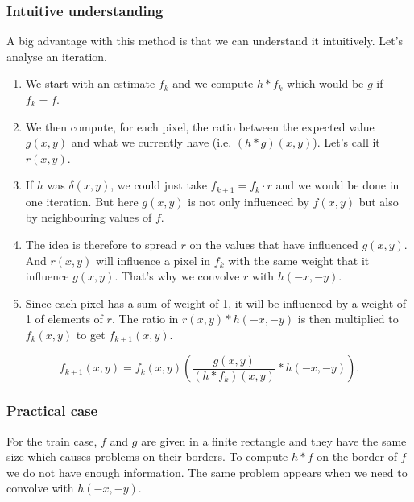 \subsubsection{Intuitive understanding}
\label{sec:lucy-intuitive}
A big advantage with this method is that we can understand
it intuitively.
Let's analyse an iteration.
\begin{enumerate}
  \item We start with an estimate $f_k$ and we compute
    $h * f_k$ which would be $g$ if $f_k = f$.
  \item We then compute, for each pixel, the ratio between
    the expected value $g(x,y)$ and what we currently have
    (i.e.  $(h * g)(x,y)$).
    Let's call it $r(x,y)$.
  \item If $h$ was $\delta(x,y)$, we could just take
    $f_{k+1} = f_k \cdot r$ and we would be done in one
    iteration.
    But here $g(x,y)$ is not only influenced by
    $f(x,y)$ but also by neighbouring values of $f$.
  \item The idea is therefore to spread $r$ on the values
    that have influenced $g(x,y)$.
    And $r(x,y)$ will influence a pixel in $f_k$ with the same
    weight that it influence $g(x,y)$.
    That's why we convolve $r$ with $h(-x,-y)$.
  \item Since each pixel has a sum of weight of 1,
    it will be influenced by a weight of 1 of elements of $r$.
    The ratio in $r(x,y) * h(-x, -y)$ is then multiplied to
    $f_k(x,y)$ to get $f_{k+1}(x,y)$.
\end{enumerate}
\[ f_{k+1}(x,y) = f_k(x,y)\left(\frac{g(x,y)}{(h*f_k)(x,y)} * h(-x,-y)\right). \]

\subsubsection{Practical case}
For the train case, $f$ and $g$ are given in a finite rectangle
and they have the same size which causes problems on their borders.
To compute $h * f$ on the border of $f$ we do not have enough
information. The same problem appears when we need to
convolve with $h(-x,-y)$.

